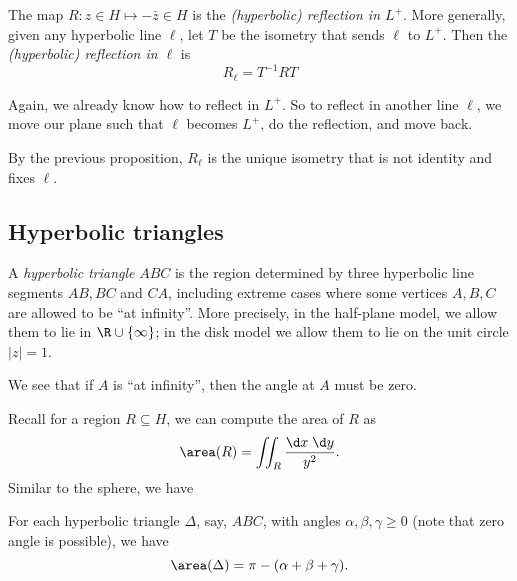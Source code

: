 \documentclass[a4paper]{article}
\begin{document}
\begin{defi}
  The map $R: z \in H \mapsto -\bar{z} \in H$ is the \emph{(hyperbolic) reflection in $L^+$}. More generally, given any hyperbolic line $\ell$, let $T$ be the isometry that sends $\ell$ to $L^+$. Then the \emph{(hyperbolic) reflection in $\ell$} is
  \[
    R_\ell = T^{-1} RT
  \]
\end{defi}
Again, we already know how to reflect in $L^+$. So to reflect in another line $\ell$, we move our plane such that $\ell$ becomes $L^+$, do the reflection, and move back.

By the previous proposition, $R_\ell$ is the unique isometry that is not identity and fixes $\ell$.

\subsection{Hyperbolic triangles}
\begin{defi}
  A \emph{hyperbolic triangle} $ABC$ is the region determined by three hyperbolic line segments $AB, BC$ and $CA$, including extreme cases where some vertices $A, B, C$ are allowed to be ``at infinity''. More precisely, in the half-plane model, we allow them to lie in $\R \cup \{\infty\}$; in the disk model we allow them to lie on the unit circle $|z| = 1$.
\end{defi}
We see that if $A$ is ``at infinity'', then the angle at $A$ must be zero.

Recall for a region $R \subseteq H$, we can compute the area of $R$ as
\[
  \area(R) = \iint_{R} \frac{\d x\;\d y}{y^2}.
\]
Similar to the sphere, we have
\begin{thm}
  For each hyperbolic triangle $\Delta$, say, $ABC$, with angles $\alpha, \beta, \gamma \geq 0$ (note that zero angle is possible), we have
  \[
    \area(\Delta) = \pi - (\alpha + \beta + \gamma).
  \]
\end{thm}
\end{document}
